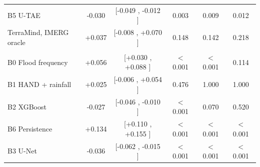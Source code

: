 \begin{tabular}{lccccc}
B5 U-TAE
& -0.030%
& [-0.049%
, -0.012%
]
& 0.003%
& 0.009%
& 0.012%
\\
TerraMind, IMERG oracle
& +0.037%
& [-0.008%
, +0.070%
]
& 0.148%
& 0.142%
& 0.218%
\\
\addlinespace
\multicolumn{6}{l}{\textit{Test B}} \\
B0 Flood frequency
& +0.056%
& [+0.030%
, +0.088%
]
& $<$0.001%
& $<$0.001%
& 0.114%
\\
B1 HAND + rainfall
& +0.025%
& [-0.006%
, +0.054%
]
& 0.476%
& 1.000%
& 1.000%
\\
B2 XGBoost
& -0.027%
& [-0.046%
, -0.010%
]
& $<$0.001%
& 0.070%
& 0.520%
\\
B6 Persistence
& +0.134%
& [+0.110%
, +0.155%
]
& $<$0.001%
& $<$0.001%
& $<$0.001%
\\
B3 U-Net
& -0.036%
& [-0.062%
, -0.015%
]
& $<$0.001%
& $<$0.001%
& $<$0.001%
\\

\end{tabular}
